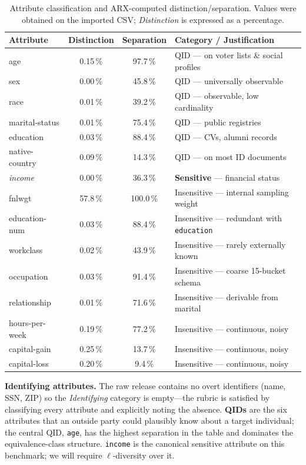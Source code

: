 \documentclass[a4paper,10pt]{article}
\begin{document}
\begin{table}[h]
\centering\small
\caption{Attribute classification and ARX-computed
  distinction/separation. Values were obtained on the imported
  CSV; \emph{Distinction} is expressed as a percentage.}
\label{tab:classification}
\begin{tabular}{l c c l}
\toprule
\textbf{Attribute} & \textbf{Distinction} & \textbf{Separation} & \textbf{Category / Justification}\\
\midrule
age            & 0.15\,\% & 97.7\,\% & QID --- on voter lists \& social profiles\\
sex            & 0.00\,\% & 45.8\,\% & QID --- universally observable\\
race           & 0.01\,\% & 39.2\,\% & QID --- observable, low cardinality\\
marital-status & 0.01\,\% & 75.4\,\% & QID --- public registries\\
education      & 0.03\,\% & 88.4\,\% & QID --- CVs, alumni records\\
native-country & 0.09\,\% & 14.3\,\% & QID --- on most ID documents\\[2pt]
\textit{income} & 0.00\,\% & 36.3\,\% & \textbf{Sensitive} --- financial status\\[2pt]
fnlwgt         & 57.8\,\% & 100.0\,\% & Insensitive --- internal sampling weight\\
education-num  & 0.03\,\% & 88.4\,\% & Insensitive --- redundant with \texttt{education}\\
workclass      & 0.02\,\% & 43.9\,\% & Insensitive --- rarely externally known\\
occupation     & 0.03\,\% & 91.4\,\% & Insensitive --- coarse 15-bucket schema\\
relationship   & 0.01\,\% & 71.6\,\% & Insensitive --- derivable from marital\\
hours-per-week & 0.19\,\% & 77.2\,\% & Insensitive --- continuous, noisy\\
capital-gain   & 0.25\,\% & 13.7\,\% & Insensitive --- continuous, noisy\\
capital-loss   & 0.20\,\% &  9.4\,\% & Insensitive --- continuous, noisy\\
\bottomrule
\end{tabular}
\end{table}

\noindent
\textbf{Identifying attributes.} The raw release contains no overt
identifiers (name, SSN, ZIP) so the \emph{Identifying} category is
empty---the rubric is satisfied by classifying every attribute and
explicitly noting the absence. \textbf{QIDs} are the six attributes
that an outside party could plausibly know
about a target individual; the central QID, \texttt{age}, has the
highest separation in the table and dominates the equivalence-class
structure. \texttt{income} is the canonical sensitive attribute on
this benchmark; we will require $\ell$-diversity over it.
\end{document}
